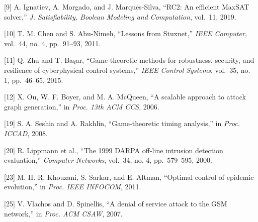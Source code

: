 \documentclass[
  11pt,
]{article}
\begin{document}
{[}9{]} A. Ignatiev, A. Morgado, and J. Marques-Silva, ``RC2: An
efficient MaxSAT solver,'' \emph{J. Satisfiability, Boolean Modeling and
Computation}, vol.~11, 2019.

{[}10{]} T. M. Chen and S. Abu-Nimeh, ``Lessons from Stuxnet,''
\emph{IEEE Computer}, vol.~44, no. 4, pp.~91--93, 2011.

{[}11{]} Q. Zhu and T. Başar, ``Game-theoretic methods for robustness,
security, and resilience of cyberphysical control systems,'' \emph{IEEE
Control Systems}, vol.~35, no. 1, pp.~46--65, 2015.

{[}12{]} X. Ou, W. F. Boyer, and M. A. McQueen, ``A scalable approach to
attack graph generation,'' in \emph{Proc. 13th ACM CCS}, 2006.

{[}19{]} S. A. Seshia and A. Rakhlin, ``Game-theoretic timing
analysis,'' in \emph{Proc. ICCAD}, 2008.

{[}20{]} R. Lippmann et al., ``The 1999 DARPA off-line intrusion
detection evaluation,'' \emph{Computer Networks}, vol.~34, no. 4,
pp.~579--595, 2000.

{[}23{]} M. H. R. Khouzani, S. Sarkar, and E. Altman, ``Optimal control
of epidemic evolution,'' in \emph{Proc. IEEE INFOCOM}, 2011.

{[}25{]} V. Vlachos and D. Spinellis, ``A denial of service attack to
the GSM network,'' in \emph{Proc. ACM CSAW}, 2007.
\end{document}
